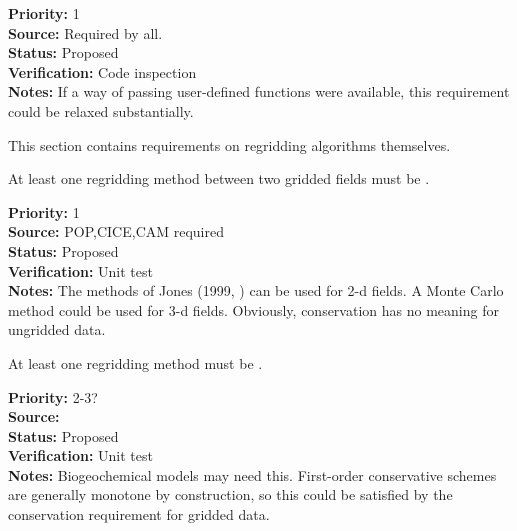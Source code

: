 \begin{reqlist}
{\bf Priority:} 1 \\
{\bf Source:} Required by all. \\
{\bf Status:} Proposed \\
{\bf Verification:} Code inspection  \\
{\bf Notes:} If a way of passing user-defined functions
             were available, this requirement could be relaxed substantially.
\end{reqlist}


This section contains requirements on regridding algorithms themselves.


At least one regridding method between two gridded fields must be
.

\begin{reqlist}
{\bf Priority:} 1 \\
{\bf Source:} POP,CICE,CAM required \\
{\bf Status:} Proposed \\
{\bf Verification:} Unit test \\
{\bf Notes:} The methods of Jones (1999, \cite{Jones1999}) can be used
             for 2-d fields. A Monte Carlo method could be used for
             3-d fields.  Obviously, conservation has no meaning
             for ungridded data.
\end{reqlist}


At least one regridding method must be .

\begin{reqlist}
{\bf Priority:} 2-3? \\
{\bf Source:}  \\
{\bf Status:} Proposed \\
{\bf Verification:} Unit test \\
{\bf Notes:} Biogeochemical models may need this.  First-order
             conservative schemes are generally monotone by
             construction, so this could be satisfied by the
             conservation requirement for gridded data.
\end{reqlist}


